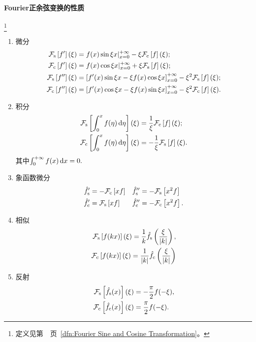 \paragraph{Fourier正余弦变换的性质}\label{The Property of Sine and Cosine Transformation}\footnote{定义见第~\pageref{dfn:Fourier Sine and Cosine Transformation}~页~\ref{dfn:Fourier Sine and Cosine Transformation}。}
\begin{enumerate}
	\item 微分
	\begin{align*}
		\cf[s]{f'}(\xi)&=f(x)\sin\xi x|_{x=0}^{+\infty}-\xi\cf[c]f(\xi);\\
		\cf[c]{f'}(\xi)&=f(x)\cos\xi x|_{x=0}^{+\infty}+\xi\cf[s]f(\xi);\\
		\cf[s]{f''}(\xi)&=\fkh{f'(x)\sin\xi x-\xi f(x)\cos\xi x}_{x=0}^{+\infty}-\xi^2\cf[s]f(\xi);\\
		\cf[c]{f''}(\xi)&=\fkh{f'(x)\cos\xi x-\xi f(x)\sin\xi x}_{x=0}^{+\infty}-\xi^2\cf[c]f(\xi).
	\end{align*}
	\item 积分
	\begin{align*}
		\cf[s]{\int_0^xf(\eta)\d\eta}(\xi)&=\frac1\xi\cf[c]f(\xi);\\
		\cf[c]{\int_0^xf(\eta)\d\eta}(\xi)&=-\frac1\xi\cf[s]f(\xi).
	\end{align*}
	其中$\int\zti f(x)\d x=0.$
	\item 象函数微分
	\begin{align*}
		\hat f_\sine'&=-\cf[c]{xf}&\hat f_\sine''&=-\cf[s]{x^2f}\\
		\hat f_\cosi'&=\cf[s]{xf}&\hat f_\cosi''&=-\cf[c]{x^2f}.
	\end{align*}
	\item 相似\begin{align*}
		\cf[s]{f(kx)}(\xi)=\frac1k\hat f_\sine\kh{\frac\xi{\abs k}},\\
		\cf[c]{f(kx)}(\xi)=\frac1{\abs k}\hat f_\cosi\kh{\frac\xi{\abs k}}
	\end{align*}
	\item 反射\begin{align*}
		\cf[s]{\hat f_\sine(x)}(\xi)&=-\frac\pi{2}f(-\xi),\\
		\cf[c]{\hat f_\cosi(x)}(\xi)&=\frac\pi{2}f(-\xi).
	\end{align*}
\end{enumerate}
